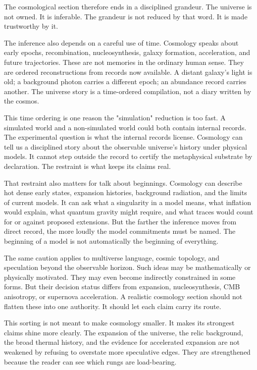 The cosmological section therefore ends in a disciplined grandeur. The
universe is not owned. It is inferable. The grandeur is not reduced by that
word. It is made trustworthy by it.

The inference also depends on a careful use of time. Cosmology speaks about
early epochs, recombination, nucleosynthesis, galaxy formation, acceleration,
and future trajectories. These are not memories in the ordinary human sense.
They are ordered reconstructions from records now available. A distant
galaxy's light is old; a background photon carries a different epoch; an
abundance record carries another. The universe story is a time-ordered
compilation, not a diary written by the cosmos.

This time ordering is one reason the "simulation" reduction is too fast. A
simulated world and a non-simulated world could both contain internal records.
The experimental question is what the internal records license. Cosmology can
tell us a disciplined story about the observable universe's history under
physical models. It cannot step outside the record to certify the metaphysical
substrate by declaration. The restraint is what keeps its claims
real.

That restraint also matters for talk about beginnings. Cosmology can describe
hot dense early states, expansion histories, background radiation, and the
limits of current models. It can ask what a singularity in a model means, what
inflation would explain, what quantum gravity might require, and what traces
would count for or against proposed extensions. But the farther the inference
moves from direct record, the more loudly the model commitments must be named.
The beginning of a model is not automatically the beginning of everything.

The same caution applies to multiverse language, cosmic topology, and
speculation beyond the observable horizon. Such ideas may be mathematically
or physically motivated. They may even become indirectly constrained in some
forms. But their decision status differs from expansion, nucleosynthesis, CMB
anisotropy, or supernova acceleration. A realistic cosmology section should
not flatten these into one authority. It should let each claim carry its
route.

This sorting is not meant to make cosmology smaller. It makes its strongest
claims shine more clearly. The expansion of the universe, the relic
background, the broad thermal history, and the evidence for accelerated
expansion are not weakened by refusing to overstate more speculative edges.
They are strengthened because the reader can see which rungs are load-bearing.

